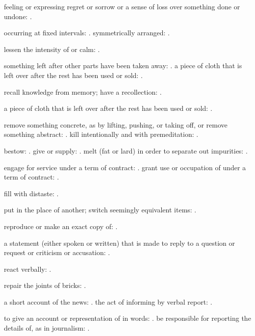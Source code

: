   feeling or expressing regret or sorrow or a sense of loss over something done or undone: .

  occurring at fixed intervals: . symmetrically arranged: .

  lessen the intensity of or calm: .

  something left after other parts have been taken away: . a piece of cloth that is left over after the rest has been used or sold: .

  recall knowledge from memory; have a recollection: .

  a piece of cloth that is left over after the rest has been used or sold: .

  remove something concrete, as by lifting, pushing, or taking off, or remove something abstract: . kill intentionally and with premeditation: .

  bestow: . give or supply: . melt (fat or lard) in order to separate out impurities: .

  engage for service under a term of contract: . grant use or occupation of under a term of contract: .

  fill with distaste: .

  put in the place of another; switch seemingly equivalent items: .

  reproduce or make an exact copy of: .

  a statement (either spoken or written) that is made to reply to a question or request or criticism or accusation: .

  react verbally: .

  repair the joints of bricks: .

  a short account of the news: . the act of informing by verbal report: .

  to give an account or representation of in words: . be responsible for reporting the details of, as in journalism: .

